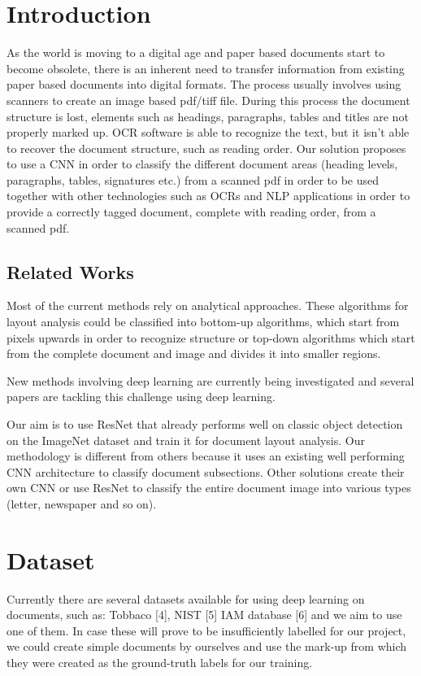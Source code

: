 \documentclass[10pt,twocolumn,letterpaper]{article}
\begin{document}
	\section{Introduction}
	As the world is moving to a digital age and paper based documents start to become obsolete, there is an inherent need to transfer information from existing paper based documents into digital formats. The process usually involves using scanners to create an image based pdf/tiff file. During this process the document structure is lost, elements such as headings, paragraphs, tables and titles are not properly marked up. OCR software is able to recognize the text, but it isn't able to recover the document structure, such as reading order. Our solution proposes to use a CNN in order to classify the different document areas (heading levels, paragraphs, tables, signatures etc.) from a scanned pdf in order to be used together with other technologies such as OCRs and NLP applications in order to provide a correctly tagged document, complete with reading order, from a scanned pdf.
	
	\subsection{Related Works}
	Most of the current methods rely on analytical approaches. These algorithms for layout analysis could be classified into bottom-up algorithms, which start from pixels upwards in order to recognize structure or top-down algorithms which start from the complete document and image and divides it into smaller regions.
	
	New methods involving deep learning are currently being investigated and several papers are tackling this challenge using deep learning.
	
	Our aim is to use ResNet that already performs well on classic object detection on the ImageNet dataset and train it for document layout analysis. Our methodology is different from others because it uses an existing well performing CNN architecture to classify document subsections. Other solutions create their own CNN or use ResNet to classify the entire document image into various types (letter, newspaper and so on).
	
	\section{Dataset}
	Currently there are several datasets available for using deep learning on documents, such as: Tobbaco [4], NIST [5] IAM database [6] and we aim to use one of them. In case these will prove to be insufficiently labelled for our project, we could create simple documents by ourselves and use the mark-up from which they were created as the ground-truth labels for our training. 
	
\end{document}
